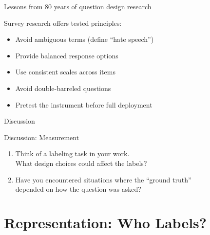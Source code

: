 \documentclass[aspectratio=169,11pt]{beamer}
\begin{document}
\begin{frame}{Lessons from 80 years of question design research}

Survey research offers tested principles:

\vspace{1em}

\begin{itemize}
  \item Avoid ambiguous terms (define ``hate speech'')
  \item Provide balanced response options
  \item Use consistent scales across items
  \item Avoid double-barreled questions
  \item Pretest the instrument before full deployment
\end{itemize}

\vspace{1em}

\hfill \citep{krosnick2010question, sudman1982asking}
\end{frame}

\begin{frame}[standout]
Discussion
\end{frame}

\begin{frame}{Discussion: Measurement}

\begin{enumerate}
  \item Think of a labeling task in your work.\\
        What design choices could affect the labels?

  \vspace{1em}

  \item Have you encountered situations where the ``ground truth''\\
        depended on how the question was asked?
\end{enumerate}
\end{frame}


\section{Representation: Who Labels?}
\end{document}
